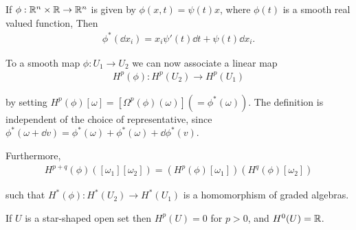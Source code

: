 \begin{example}\label{example:3-14}
If $\phi:{\mathbb{R}}^n\times{\ensuremath{\mathbb{R}}}\to{\ensuremath{\mathbb{R}}}^n$ is given by $\phi(x, t) = \psi(t)x$, where $\phi(t)$ is a smooth real 
valued function, Then 
\begin{align*}
  \phi^*(\!\dd x_i) = x_i \psi'(t)\dd t + \psi(t) \dd x_i.
\end{align*}

To a smooth map $\phi:U_1\to U_2$ we can now associate a linear map
\begin{align*}
  H^p(\phi): H^p(U_2) \to H^p(U_1)
\end{align*}

by setting $H^p(\phi)[\omega] = [\Omega^p(\phi)(\omega)] (=\phi^*(\omega))$. The definition is independent of the
choice of representative, since $\phi^*(\omega+\dd v) = \phi^*(\omega) + \phi^*(\omega) + \dd\phi^*(v)$. 

Furthermore,
\begin{align*}
  H^{p+q}(\phi)([\omega_1][\omega_2]) = (H^p(\phi)[\omega_1])(H^q(\phi)[\omega_2]) 
\end{align*}

such that $H^*(\phi):H^*(U_2)\to H^*(U_1)$ is a homomorphism of graded algebras.
\end{example}

\begin{theorem}\label{theorem:3-15}
If $U$ is a star-shaped open set then $H^p(U) = 0$ for $p > 0$, and $H^0(U) = {\mathbb{R}}$.
\end{theorem}

